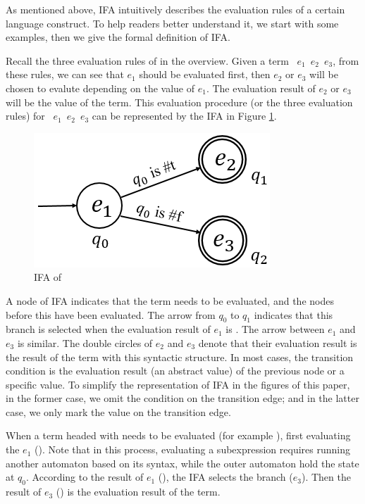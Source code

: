 As mentioned above, IFA intuitively describes the evaluation rules of a certain language construct. To help readers better understand it, we start with some examples, then we give the formal definition of IFA.

\begin{example}[IFA of~~ \m{if}]

Recall the three evaluation rules of  in the overview. Given a term ~$e_1$~$e_2$~$e_3$, from these rules, we can see that $e_1$ should be evaluated first, then $e_2$ or $e_3$ will be chosen to evalute depending on the value of $e_1$. The evaluation result of $e_2$ or $e_3$ will be the value of the term. This evaluation procedure (or the three evaluation rules) for ~$e_1$~$e_2$~$e_3$ can be represented by the IFA in Figure \ref{fig:ifa-if}.

\begin{figure}[t]
	\centering
	\includegraphics[scale=0.25]{images/ifa/ifa-if.png}
	\caption{IFA of }
	\label{fig:ifa-if}
\end{figure}

A node of IFA indicates that the term needs to be evaluated, and the nodes before this have been evaluated. The arrow from $q_0$ to $q_1$ indicates that this branch is selected when the evaluation result of $e_1$ is . The arrow between $e_1$ and $e_3$ is similar. The double circles of $e_2$ and $e_3$ denote that their evaluation result is the result of the term with this syntactic structure. In most cases, the transition condition is the evaluation result (an abstract value) of the previous node or a specific value. To simplify the representation of IFA in the figures of this paper, in the former case, we omit the condition on the transition edge; and in the latter case, we only mark the value on the transition edge.

When a term headed with  needs to be evaluated (for example ), first evaluating the $e_1$ (). Note that in this process, evaluating a subexpression requires running another automaton based on its syntax, while the outer automaton hold the state at $q_0$. According to the result of $e_1$ (), the IFA selects the branch ($e_3$). Then the result of $e_3$ () is the evaluation result of the term.
\myend
\end{example}

